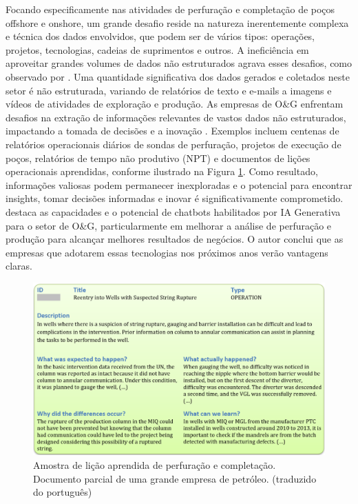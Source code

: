 Focando especificamente nas atividades de perfuração e completação de poços offshore e onshore, um grande desafio reside na natureza inerentemente complexa e técnica dos dados envolvidos, que podem ser de vários tipos: operações, projetos, tecnologias, cadeias de suprimentos e outros.
A ineficiência em aproveitar grandes volumes de dados não estruturados agrava esses desafios, como observado por \cite{Singh2023}. Uma quantidade significativa dos dados gerados e coletados neste setor é não estruturada, variando de relatórios de texto e e-mails a imagens e vídeos de atividades de exploração e produção.
As empresas de O\&G enfrentam desafios na extração de informações relevantes de vastos dados não estruturados, impactando a tomada de decisões e a inovação \cite{Singh2023}.
Exemplos incluem centenas de relatórios operacionais diários de sondas de perfuração, projetos de execução de poços, relatórios de tempo não produtivo (NPT) e documentos de lições operacionais aprendidas, conforme ilustrado na Figura \ref{fig:report_example}.
Como resultado, informações valiosas podem permanecer inexploradas e o potencial para encontrar insights, tomar decisões informadas e inovar é significativamente comprometido.
\cite{Singh2023} destaca as capacidades e o potencial de chatbots habilitados por IA Generativa para o setor de O\&G, particularmente em melhorar a análise de perfuração e produção para alcançar melhores resultados de negócios. O autor conclui que as empresas que adotarem essas tecnologias nos próximos anos verão vantagens claras.

\begin{figure}[t]
  \centering
  \includegraphics[width=1\textwidth]{images/report_example.png}
  \caption{Amostra de lição aprendida de perfuração e completação. Documento parcial de uma grande empresa de petróleo. (traduzido do português)}
  \label{fig:report_example}
\end{figure}

